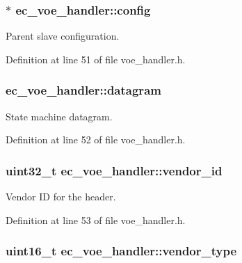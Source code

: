 \subsubsection[{config}]{$\ast$ ec\-\_\-voe\-\_\-handler\-::config}\label{structec__voe__handler_a0d54cd53df6b6aa0d3f5d0bdd4d61686}


Parent slave configuration. 



Definition at line 51 of file voe\-\_\-handler.\-h.

\subsubsection[{datagram}]{ ec\-\_\-voe\-\_\-handler\-::datagram}\label{structec__voe__handler_a22dc8e8a089f2a9df8336828d4ddcbe6}


State machine datagram. 



Definition at line 52 of file voe\-\_\-handler.\-h.

\subsubsection[{vendor\-\_\-id}]{\setlength{\rightskip}{0pt plus 5cm}uint32\-\_\-t ec\-\_\-voe\-\_\-handler\-::vendor\-\_\-id}\label{structec__voe__handler_a2c8f52c786041ad0600c3d3b84db48e7}


Vendor I\-D for the header. 



Definition at line 53 of file voe\-\_\-handler.\-h.

\subsubsection[{vendor\-\_\-type}]{\setlength{\rightskip}{0pt plus 5cm}uint16\-\_\-t ec\-\_\-voe\-\_\-handler\-::vendor\-\_\-type}\label{structec__voe__handler_aa0f8674c035659f9f2850045ed641139}


